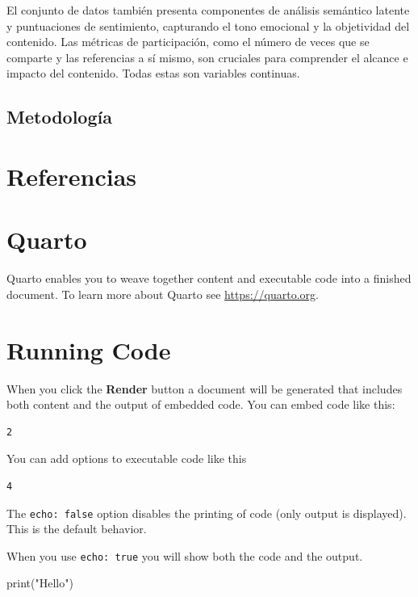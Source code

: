 \documentclass[
  number,
  preprint,
  3p,
  twocolumn]{elsarticle}
\newenvironment{Shaded}{\begin{snugshade}}{\end{snugshade}}
\newcommand{\BuiltInTok}[1]{\textcolor[rgb]{0.00,0.23,0.31}{#1}}
\newcommand{\NormalTok}[1]{\textcolor[rgb]{0.00,0.23,0.31}{#1}}
\newcommand{\StringTok}[1]{\textcolor[rgb]{0.13,0.47,0.30}{#1}}
\begin{document}
El conjunto de datos también presenta componentes de análisis semántico
latente y puntuaciones de sentimiento, capturando el tono emocional y la
objetividad del contenido. Las métricas de participación, como el número
de veces que se comparte y las referencias a sí mismo, son cruciales
para comprender el alcance e impacto del contenido. Todas estas son
variables continuas.

\subsection{Metodología}\label{metodologuxeda}

\section{Referencias}\label{referencias}

\section{Quarto}\label{quarto}

Quarto enables you to weave together content and executable code into a
finished document. To learn more about Quarto see
\url{https://quarto.org}.

\section{Running Code}\label{running-code}

When you click the \textbf{Render} button a document will be generated
that includes both content and the output of embedded code. You can
embed code like this:

\begin{verbatim}
2
\end{verbatim}

You can add options to executable code like this

\begin{verbatim}
4
\end{verbatim}

The \texttt{echo:\ false} option disables the printing of code (only
output is displayed). This is the default behavior.

When you use \texttt{echo:\ true} you will show both the code and the
output.

\begin{Shaded}
\begin{Highlighting}[]
\BuiltInTok{print}\NormalTok{(}\StringTok{"Hello"}\NormalTok{)}
\end{Highlighting}
\end{Shaded}
\end{document}
